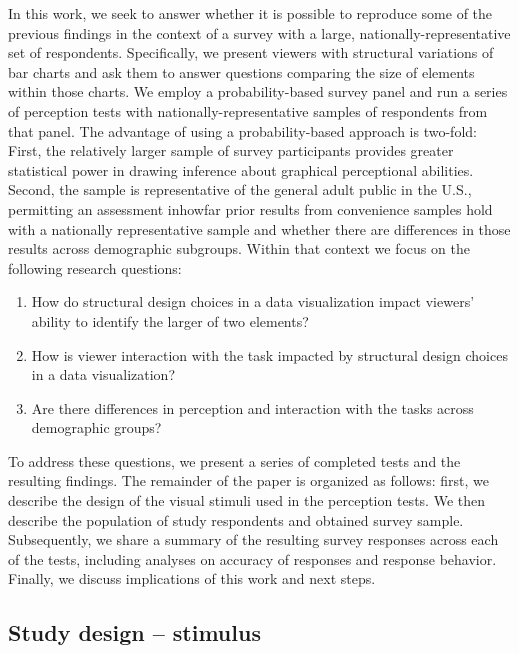 \documentclass[
]{jds}
\begin{document}
In this work, we seek to answer whether it is possible to reproduce some
of the previous findings in the context of a survey with a large,
nationally-representative set of respondents. Specifically, we present
viewers with structural variations of bar charts and ask them to answer
questions comparing the size of elements within those charts. We employ
a probability-based survey panel and run a series of perception tests
with nationally-representative samples of respondents from that panel.
The advantage of using a probability-based approach is two-fold: First,
the relatively larger sample of survey participants provides greater
statistical power in drawing inference about graphical perceptional
abilities. Second, the sample is representative of the general adult
public in the U.S., permitting an assessment inhowfar prior results from
convenience samples hold with a nationally representative sample and
whether there are differences in those results across demographic
subgroups. Within that context we focus on the following research
questions:

\begin{enumerate}
\def\labelenumi{\arabic{enumi}.}
\item
  How do structural design choices in a data visualization impact
  viewers' ability to identify the larger of two elements?
\item
  How is viewer interaction with the task impacted by structural design
  choices in a data visualization?
\item
  Are there differences in perception and interaction with the tasks
  across demographic groups?
\end{enumerate}

To address these questions, we present a series of completed tests and
the resulting findings. The remainder of the paper is organized as
follows: first, we describe the design of the visual stimuli used in the
perception tests. We then describe the population of study respondents
and obtained survey sample. Subsequently, we share a summary of the
resulting survey responses across each of the tests, including analyses
on accuracy of responses and response behavior. Finally, we discuss
implications of this work and next steps.

\hypertarget{study-design-stimulus}{%
\subsection{Study design -- stimulus}\label{study-design-stimulus}}
\end{document}
